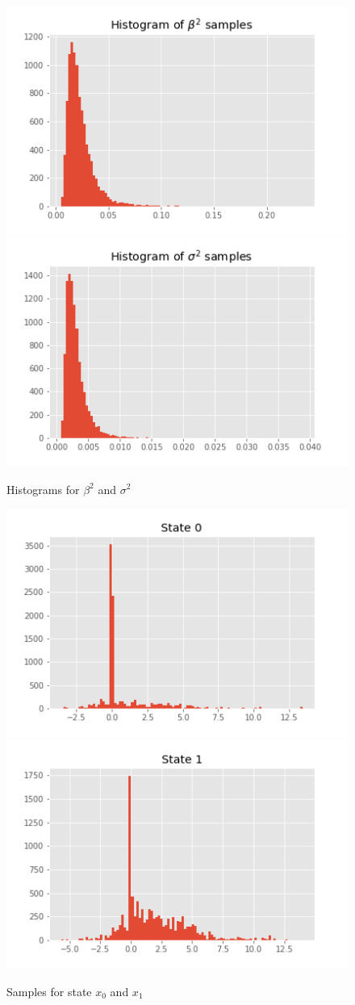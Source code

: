 \documentclass[]{article}
\begin{document}
\begin{figure}[H]
	\begin{center}
				
		\includegraphics[width=.4\textwidth]{task2/figures/T_2_2/Q2/plt_beta.png}
		\includegraphics[width=.4\textwidth]{task2/figures/T_2_2/Q2/plt_sigma.png}
		\caption*{Histograms for $\beta^2$ and $\sigma^2$}
	\end{center}
\end{figure}
\begin{figure}[H]
	\begin{center}


		\includegraphics[width=.4\textwidth]{task2/figures/T_2_2/Q2/plt_x0.png}
		\includegraphics[width=.4\textwidth]{task2/figures/T_2_2/Q2/plt_x1.png}
		
		\caption*{Samples for state $x_0$ and $x_1$}
	\end{center}
\end{figure}
\end{document}
